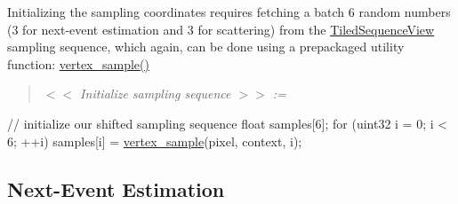\begin{DoxyParagraph}{}
Initializing the sampling coordinates requires fetching a batch 6 random numbers (3 for next-\/event estimation and 3 for scattering) from the \hyperlink{struct_tiled_sequence_view}{Tiled\+Sequence\+View} sampling sequence, which again, can be done using a prepackaged utility function\+: \hyperlink{group___p_t_lib_core_ga4881c06f23dccad0fc8972bda8de1b40}{vertex\+\_\+sample()} ~\newline
\label{_hello_renderer_page_Initialize_sampling_sequence_anchor}%
%
 \begin{quote}
{\itshape  $<$$<$ Initialize sampling sequence $>$$>$ \+:= }

\end{quote}

\begin{DoxyCode}
\textcolor{comment}{// initialize our shifted sampling sequence}
\textcolor{keywordtype}{float} samples[6];
\textcolor{keywordflow}{for} (uint32 i = 0; i < 6; ++i)
    samples[i] = \hyperlink{group___p_t_lib_core_ga4881c06f23dccad0fc8972bda8de1b40}{vertex\_sample}(pixel, context, i);
\end{DoxyCode}

\end{DoxyParagraph}
\hypertarget{_hello_renderer_page_NextEventEstimationSection}{}\subsection{Next-\/\+Event Estimation}\label{_hello_renderer_page_NextEventEstimationSection}
